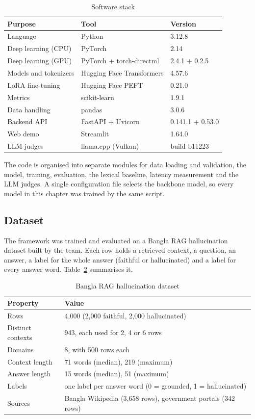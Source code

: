 \begin{table}[htbp]
\centering
\caption{Software stack}
\label{tab:software}
\begin{tabular}{lll}
\hline
\textbf{Purpose} & \textbf{Tool} & \textbf{Version} \\
\hline
Language & Python & 3.12.8 \\
Deep learning (CPU) & PyTorch & 2.14 \\
Deep learning (GPU) & PyTorch + torch-directml & 2.4.1 + 0.2.5 \\
Models and tokenizers & Hugging Face Transformers & 4.57.6 \\
LoRA fine-tuning & Hugging Face PEFT & 0.21.0 \\
Metrics & scikit-learn & 1.9.1 \\
Data handling & pandas & 3.0.6 \\
Backend API & FastAPI + Uvicorn & 0.141.1 + 0.53.0 \\
Web demo & Streamlit & 1.64.0 \\
LLM judges & llama.cpp (Vulkan) & build b11223 \\
\hline
\end{tabular}
\end{table}

The code is organised into separate modules for data loading and validation,
the model, training, evaluation, the lexical baseline, latency measurement and
the LLM judges. A single configuration file selects the backbone model, so
every model in this chapter was trained by the same script.

\subsection{Dataset}

The framework was trained and evaluated on a Bangla RAG hallucination dataset
built by the team. Each row holds a retrieved context, a question, an answer,
a label for the whole answer (faithful or hallucinated) and a label for every
answer word. Table~\ref{tab:dataset} summarises it.

\begin{table}[htbp]
\centering
\caption{Bangla RAG hallucination dataset}
\label{tab:dataset}
\begin{tabular}{ll}
\hline
\textbf{Property} & \textbf{Value} \\
\hline
Rows & 4,000 (2,000 faithful, 2,000 hallucinated) \\
Distinct contexts & 943, each used for 2, 4 or 6 rows \\
Domains & 8, with 500 rows each \\
Context length & 71 words (median), 219 (maximum) \\
Answer length & 15 words (median), 51 (maximum) \\
Labels & one label per answer word (0 = grounded, 1 = hallucinated) \\
Sources & Bangla Wikipedia (3,658 rows), government portals (342 rows) \\
\hline
\end{tabular}
\end{table}

